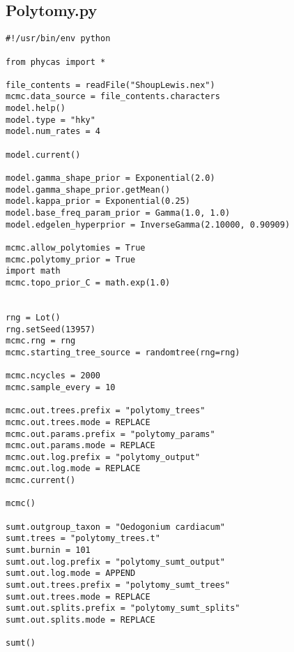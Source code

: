 \documentclass{article}
\begin{document}
\subsection{Polytomy.py}\label{Polytomy}
\begin{verbatim}
#!/usr/bin/env python

from phycas import *

file_contents = readFile("ShoupLewis.nex")
mcmc.data_source = file_contents.characters
model.help()
model.type = "hky"
model.num_rates = 4

model.current()

model.gamma_shape_prior = Exponential(2.0)
model.gamma_shape_prior.getMean()
model.kappa_prior = Exponential(0.25)
model.base_freq_param_prior = Gamma(1.0, 1.0)
model.edgelen_hyperprior = InverseGamma(2.10000, 0.90909)

mcmc.allow_polytomies = True
mcmc.polytomy_prior = True
import math
mcmc.topo_prior_C = math.exp(1.0)


rng = Lot()
rng.setSeed(13957)
mcmc.rng = rng
mcmc.starting_tree_source = randomtree(rng=rng)

mcmc.ncycles = 2000
mcmc.sample_every = 10

mcmc.out.trees.prefix = "polytomy_trees"
mcmc.out.trees.mode = REPLACE 
mcmc.out.params.prefix = "polytomy_params"
mcmc.out.params.mode = REPLACE 
mcmc.out.log.prefix = "polytomy_output"
mcmc.out.log.mode = REPLACE 
mcmc.current()

mcmc()

sumt.outgroup_taxon = "Oedogonium cardiacum"
sumt.trees = "polytomy_trees.t" 
sumt.burnin = 101 
sumt.out.log.prefix = "polytomy_sumt_output"
sumt.out.log.mode = APPEND 
sumt.out.trees.prefix = "polytomy_sumt_trees"
sumt.out.trees.mode = REPLACE 
sumt.out.splits.prefix = "polytomy_sumt_splits"
sumt.out.splits.mode = REPLACE 

sumt()
\end{verbatim}


\newpage
\end{document}
